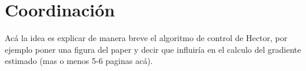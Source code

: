 \newpage
\thispagestyle{empty}
\mbox{}

\chapter{Coordinación}
\label{ch:chapter4}

Acá la idea es explicar de manera breve el algoritmo de control de Hector, por ejemplo poner una figura del paper y decir que influiría en el calculo del gradiente estimado (mas o menos 5-6 paginas acá).